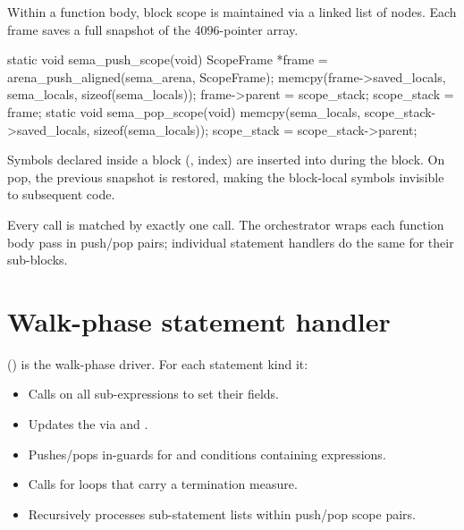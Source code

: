 \pnum
Within a function body, block scope is maintained via a linked list of
 nodes.  Each frame saves a full snapshot of the 4096-pointer
 array.

\begin{ccode}
static void sema_push_scope(void) {
    ScopeFrame *frame = arena_push_aligned(sema_arena, ScopeFrame);
    memcpy(frame->saved_locals, sema_locals, sizeof(sema_locals));
    frame->parent = scope_stack;
    scope_stack = frame;
}
static void sema_pop_scope(void) {
    memcpy(sema_locals, scope_stack->saved_locals, sizeof(sema_locals));
    scope_stack = scope_stack->parent;
}
\end{ccode}

\pnum
Symbols declared inside a block (,  index)
are inserted into  during the block.  On pop, the previous
snapshot is restored, making the block-local symbols invisible to subsequent code.

\begin{invariant}
Every  call is matched by exactly one
 call.  The orchestrator wraps each function body
pass in push/pop pairs; individual statement handlers do the same for their
sub-blocks.
\end{invariant}

\section{Walk-phase statement handler}
\label{sec:sema-walk}

\pnum
{} () is the walk-phase driver.  For
each statement kind it:
\begin{itemize}
\item Calls  on all sub-expressions to set their
   fields.
\item Updates the  via  and
  .
\item Pushes/pops in-guards for  and 
  conditions containing  expressions.
\item Calls  for  loops that
  carry a termination measure.
\item Recursively processes sub-statement lists within push/pop scope pairs.
\end{itemize}

